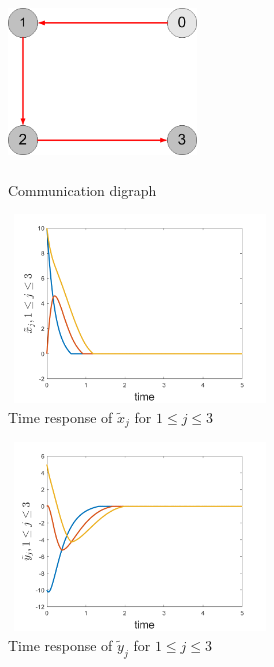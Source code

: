 \documentclass[letterpaper, 10 pt, conference]{ieeeconf}  %
\begin{document}
\begin{figure}
\begin{center}
\includegraphics[width=5cm,height=5cm]{comm2}
\caption{Communication digraph\label{commd}}
\end{center}
\end{figure}


\begin{figure}

\includegraphics[width=7cm,height=5cm]{xen}
\caption{Time response of $\tilde{x}_{j}$ for $1\leq j\leq
3$\label{xed}}
\end{figure}

\begin{figure}
\includegraphics[width=7cm,height=5cm]{yen}
\caption{Time response of $\tilde{y}_{j}$ for $1\leq j\leq
3$\label{yed}}
\end{figure}
\end{document}
